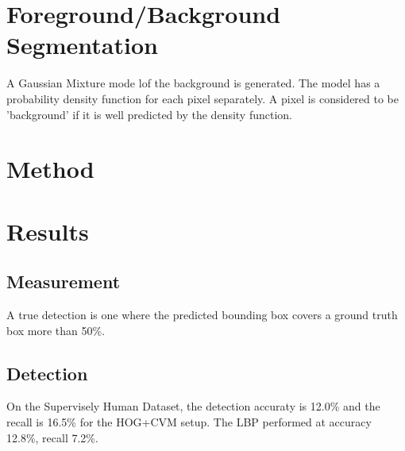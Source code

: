 \documentclass{article}
\begin{document}
\section{Foreground/Background Segmentation}
A Gaussian Mixture mode lof the background is generated\cite{knn_background_subt}.
The model has a probability density function for each pixel separately.
A pixel is considered to be 'background' if it is well predicted by the density function.

\section{Method}


\section{Results}
\subsection{Measurement}
A true detection is one where the predicted bounding box covers a ground truth box more than 50\%.

\subsection{Detection}
On the Supervisely Human Dataset, the detection accuraty is 12.0\% and the recall is 16.5\% for the HOG+CVM setup.
The LBP performed at accuracy 12.8\%, recall 7.2\%.
\end{document}
